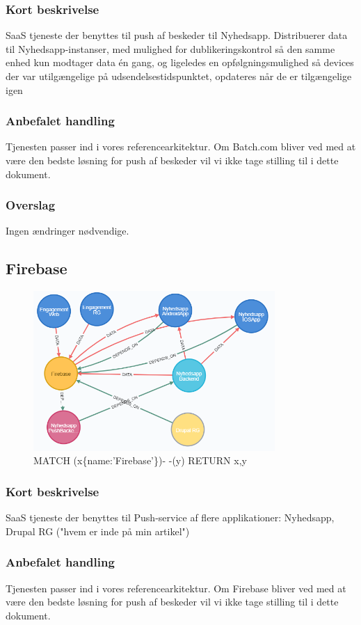 \documentclass{article}
\begin{document}
\subsubsection{Kort beskrivelse}
SaaS tjeneste der benyttes til push af beskeder til Nyhedsapp.
Distribuerer data til Nyhedsapp-instanser, med mulighed for dublikeringskontrol så den samme enhed kun modtager data én gang, og ligeledes en opfølgningsmulighed så devices der var utilgængelige på udsendelsestidspunktet, opdateres når de er tilgængelige igen
\subsubsection{Anbefalet handling}
Tjenesten passer ind i vores referencearkitektur. Om Batch.com bliver ved med at være den bedste løsning for push af beskeder vil vi ikke tage stilling til i dette dokument.
\subsubsection{Overslag}
Ingen ændringer nødvendige.


\subsection{Firebase}
\begin{figure}[h]
\includegraphics[width=260pt]{Firebase.PNG}
\caption{MATCH (x\{name:'Firebase'\})- -(y) RETURN x,y}
\end{figure}
\subsubsection{Kort beskrivelse}
SaaS tjeneste der benyttes til Push-service af flere applikationer:
Nyhedsapp, Drupal RG ("hvem er inde på min artikel")
\subsubsection{Anbefalet handling}
Tjenesten passer ind i vores referencearkitektur. Om Firebase bliver ved med at være den bedste løsning for push af beskeder vil vi ikke tage stilling til i dette dokument.
\end{document}
